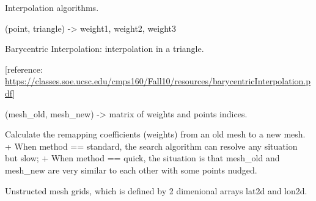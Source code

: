 \documentclass[letterpaper,10pt,english]{sphinxmanual}
\begin{document}

\begin{fulllineitems}
\label{code:pyesg.Interp}
Interpolation algorithms.

\begin{fulllineitems}
\label{code:pyesg.Interp.barycentric}
(point, triangle) -\textgreater{} weight1, weight2, weight3

Barycentric Interpolation: interpolation in a triangle.

{[}reference: \href{https://classes.soe.ucsc.edu/cmps160/Fall10/resources/barycentricInterpolation.pdf}{https://classes.soe.ucsc.edu/cmps160/Fall10/resources/barycentricInterpolation.pdf}{]}

\end{fulllineitems}


\begin{fulllineitems}
\label{code:pyesg.Interp.regrid}
(mesh\_old, mesh\_new) -\textgreater{} matrix of weights and points indices.

Calculate the remapping coefficients (weights) from an old mesh to a new mesh.
+ When method == standard, the search algorithm can resolve any situation but slow;
+ When method == quick, the situation is that mesh\_old and mesh\_new are very similar
to each other with some points nudged.

\end{fulllineitems}


\end{fulllineitems}


\begin{fulllineitems}
\label{code:pyesg.Mesh}
Unstructed mesh grids, which is defined by 2 dimenional arrays lat2d and lon2d.

\end{fulllineitems}

\end{document}
